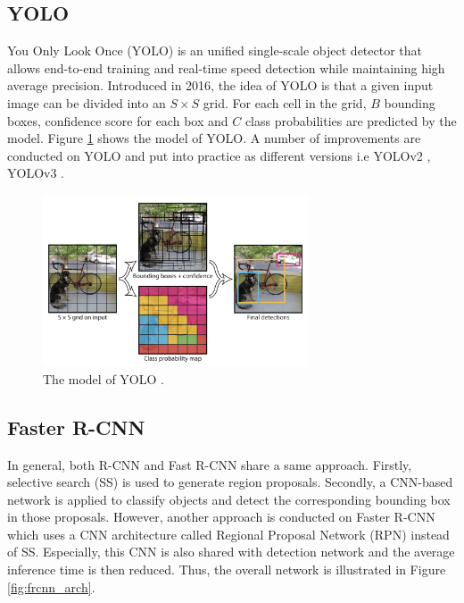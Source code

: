 \subsection{YOLO}
You Only Look Once (YOLO) \cite{YOLO} is an unified single-scale object detector that allows end-to-end training and real-time speed detection while maintaining high average precision. Introduced in 2016, the idea of YOLO is that a given input image can be divided into an $S \times S$  grid. For each cell in the grid, $B$ bounding boxes, confidence score for each box and $C$ class probabilities are predicted by the model. Figure \ref{fig:yolo_arch} shows the model of YOLO. A number of improvements are conducted on YOLO and put into practice as different versions i.e YOLOv2 \cite{YOLOv2}, YOLOv3 \cite{YOLOv3}.
\begin{figure}[thb]
    \centering
    \includegraphics[width=0.7\textwidth]{endoscopy_resources/yolo.png}
    \caption{The model of YOLO \cite{YOLO}.}
    \label{fig:yolo_arch}
\end{figure}

\subsection{Faster R-CNN}
In general, both R-CNN \cite{RCNN} and Fast R-CNN \cite{FastRCNN} share a same approach. Firstly, selective search (SS) \cite{Uijlings2013} is used to generate region proposals. Secondly, a CNN-based network is applied to classify objects and detect the corresponding bounding box in those proposals. However, another approach is conducted on Faster R-CNN \cite{FasterRCNN} which uses a CNN architecture called Regional Proposal Network (RPN) instead of SS. Especially, this CNN is also shared with detection network and the average inference time is then reduced. Thus, the overall network is illustrated in Figure \ref{fig:frcnn_arch}.


